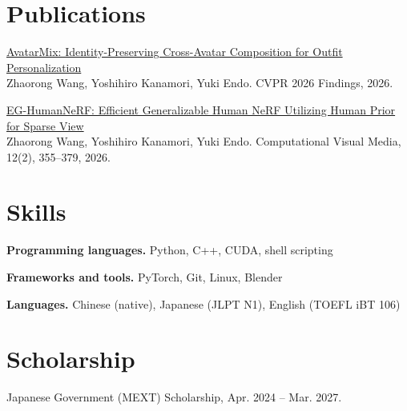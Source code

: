 \documentclass[a4paper,11pt]{article}
\newcommand{\field}[2]{\par\textbf{#1.} #2\par}
\begin{document}
\section{Publications}
\href{https://openaccess.thecvf.com/content/CVPR2026F/html/Wang_AvatarMix_Identity-Preserving_Cross-Avatar_Composition_for_Outfit_Personalization_CVPRF_2026_paper.html}{AvatarMix: Identity-Preserving Cross-Avatar Composition for Outfit Personalization}\\
Zhaorong Wang, Yoshihiro Kanamori, Yuki Endo. CVPR 2026 Findings, 2026.

\href{https://doi.org/10.26599/CVM.2025.9450508}{EG-HumanNeRF: Efficient Generalizable Human NeRF Utilizing Human Prior for Sparse View}\\
Zhaorong Wang, Yoshihiro Kanamori, Yuki Endo. Computational Visual Media, 12(2), 355--379, 2026.


\section{Skills}
\field{Programming languages}{Python, C++, CUDA, shell scripting}
\field{Frameworks and tools}{PyTorch, Git, Linux, Blender}
\field{Languages}{Chinese (native), Japanese (JLPT N1), English (TOEFL iBT 106)}
\section{Scholarship}
Japanese Government (MEXT) Scholarship, Apr. 2024 -- Mar. 2027.
\end{document}
